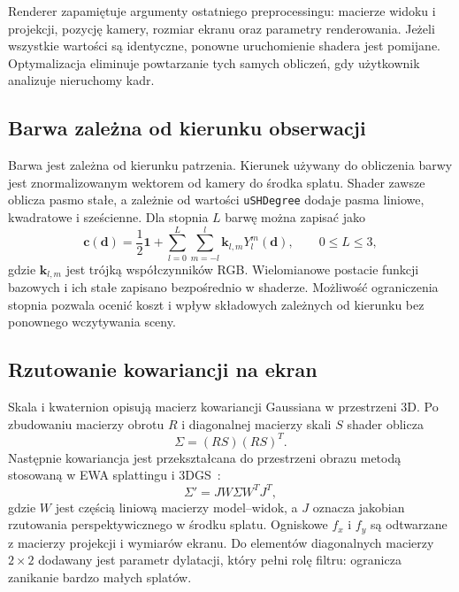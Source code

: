 Renderer zapamiętuje argumenty ostatniego preprocessingu: macierze widoku i projekcji, pozycję kamery, rozmiar ekranu oraz parametry renderowania. Jeżeli wszystkie wartości są identyczne, ponowne uruchomienie shadera jest pomijane. Optymalizacja eliminuje powtarzanie tych samych obliczeń, gdy użytkownik analizuje nieruchomy kadr.

\subsection{Barwa zależna od kierunku obserwacji}
\label{subsec:impl_sh}

Barwa jest zależna od kierunku patrzenia. Kierunek używany do obliczenia barwy jest znormalizowanym wektorem od kamery do środka splatu. Shader zawsze oblicza pasmo stałe, a zależnie od wartości \texttt{uSHDegree} dodaje pasma liniowe, kwadratowe i sześcienne. Dla stopnia $L$ barwę można zapisać jako
\begin{equation}
  \mathbf{c}(\mathbf{d})=\frac{1}{2}\mathbf{1}+
  \sum_{l=0}^{L}\sum_{m=-l}^{l}
  \mathbf{k}_{l,m}Y_l^m(\mathbf{d}), \qquad 0\leq L\leq3,
  \label{eq:impl_sh}
\end{equation}
gdzie $\mathbf{k}_{l,m}$ jest trójką współczynników RGB. Wielomianowe postacie funkcji bazowych i ich stałe zapisano bezpośrednio w shaderze. Możliwość ograniczenia stopnia pozwala ocenić koszt i wpływ składowych zależnych od kierunku bez ponownego wczytywania sceny.

\subsection{Rzutowanie kowariancji na ekran}
\label{subsec:impl_kowariancja}

Skala i kwaternion opisują macierz kowariancji Gaussiana w przestrzeni 3D. Po zbudowaniu macierzy obrotu $R$ i diagonalnej macierzy skali $S$ shader oblicza
\begin{equation}
  \Sigma = (RS)(RS)^{T}.
  \label{eq:impl_cov3d}
\end{equation}
Następnie kowariancja jest przekształcana do przestrzeni obrazu metodą stosowaną w EWA splattingu i 3DGS~\cite{zwicker2002ewa,kerbl2023gaussian}:
\begin{equation}
  \Sigma' = J W \Sigma W^{T}J^{T},
  \label{eq:impl_cov2d}
\end{equation}
gdzie $W$ jest częścią liniową macierzy model--widok, a $J$ oznacza jakobian rzutowania perspektywicznego w środku splatu. Ogniskowe $f_x$ i $f_y$ są odtwarzane z macierzy projekcji i wymiarów ekranu. Do elementów diagonalnych macierzy $2\times2$ dodawany jest parametr dylatacji, który pełni rolę filtru: ogranicza zanikanie bardzo małych splatów.

